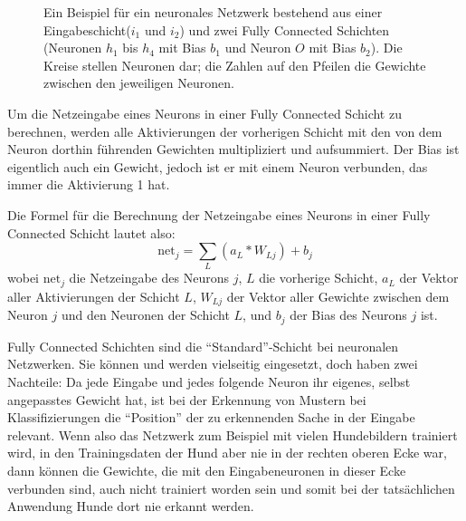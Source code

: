 \documentclass[10pt]{article}
\newcommand{\form}[1]{#1} %
\newcommand{\feng}[1]{{#1}}
\newcommand{\netin}{\textrm{net}}
\begin{document}
\begin{figure}[h!]
{
    }
    \caption{Ein Beispiel für ein neuronales Netzwerk bestehend aus einer Eingabeschicht($i_1$ und $i_2$) und zwei Fully Connected Schichten (Neuronen $h_1$ bis $h_4$ mit Bias $b_1$ und Neuron $O$ mit Bias $b_2$). 
    Die Kreise stellen Neuronen dar; die Zahlen auf den Pfeilen die Gewichte zwischen den jeweiligen Neuronen.}
    \label{fig:dense_nn}
\end{figure}

Um die Netzeingabe eines Neurons in einer Fully Connected Schicht zu berechnen, werden alle Aktivierungen der vorherigen Schicht mit den von dem Neuron dorthin führenden Gewichten multipliziert und aufsummiert.
Der Bias ist eigentlich auch ein Gewicht, jedoch ist er mit einem Neuron verbunden, das immer die Aktivierung 1 hat. \cite{brotcrunsher:forwardpass}

Die Formel für die Berechnung der Netzeingabe eines Neurons in einer Fully Connected Schicht lautet also:
%
\form{\[
	\netin_j = \sum_{L} (a_{L} * W_{Lj}) + b_{j}
	\]}
\noindent wobei $\netin_j$ die Netzeingabe des Neurons $j$, $L$ die vorherige Schicht, $a_L$ der Vektor aller Aktivierungen der Schicht $L$, $W_{Lj}$ der Vektor aller Gewichte zwischen dem Neuron $j$ und den Neuronen der Schicht $L$, und $b_j$ der Bias des Neurons $j$ ist. 


Fully Connected Schichten sind die \enquote{Standard}-Schicht bei neuronalen Netzwerken. 
Sie können und werden vielseitig eingesetzt, doch haben zwei Nachteile: 
Da jede Eingabe und jedes folgende Neuron ihr eigenes, selbst angepasstes Gewicht hat, ist bei der Erkennung von Mustern bei Klassifizierungen die \enquote{Position} der zu erkennenden Sache in der Eingabe relevant.
Wenn also das Netzwerk zum Beispiel mit vielen Hundebildern trainiert wird, in den Trainingsdaten der Hund aber nie in der rechten oberen Ecke war, dann können die Gewichte, die mit den Eingabeneuronen in dieser Ecke verbunden sind, auch nicht trainiert worden sein und somit bei der tatsächlichen Anwendung Hunde dort nie erkannt werden.
\end{document}
